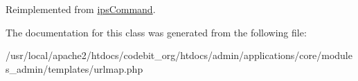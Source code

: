 Reimplemented from \hyperlink{classips_command_afbc4e912a0604b94d47d66744c64d8ba}{ips\-Command}.



The documentation for this class was generated from the following file\-:\begin{DoxyCompactItemize}
\item 
/usr/local/apache2/htdocs/codebit\-\_\-org/htdocs/admin/applications/core/modules\-\_\-admin/templates/urlmap.\-php\end{DoxyCompactItemize}
